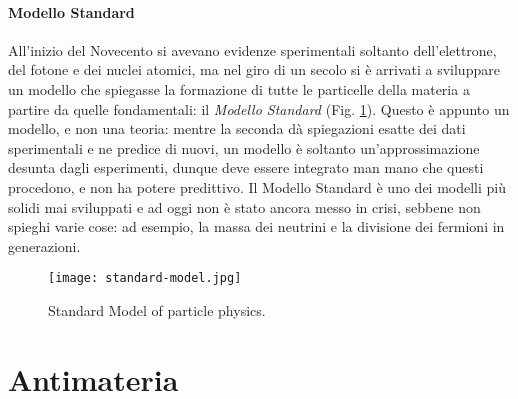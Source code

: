 \paragraph{Modello Standard}

All'inizio del Novecento si avevano evidenze sperimentali soltanto dell'elettrone, del fotone e dei nuclei atomici, ma nel giro di un secolo si è arrivati a sviluppare un modello che spiegasse la formazione di tutte le particelle della materia a partire da quelle fondamentali: il \textit{Modello Standard} (Fig. \ref{standard-model}). Questo è appunto un modello, e non una teoria: mentre la seconda dà spiegazioni esatte dei dati sperimentali e ne predice di nuovi, un modello è soltanto un'approssimazione desunta dagli esperimenti, dunque deve essere integrato man mano che questi procedono, e non ha potere predittivo. Il Modello Standard è uno dei modelli più solidi mai sviluppati e ad oggi non è stato ancora messo in crisi, sebbene non spieghi varie cose: ad esempio, la massa dei neutrini e la divisione dei fermioni in generazioni.

\begin{figure}
	\centering
	\texttt{[image: standard-model.jpg]}
	\caption{Standard Model of particle physics.}
	\label{standard-model}
\end{figure}

\section{Antimateria}

